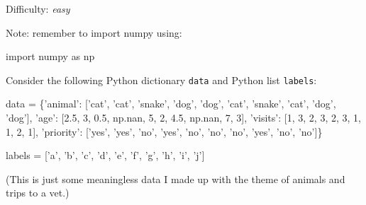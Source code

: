 \documentclass[11pt]{article}
\newenvironment{Shaded}{}{}
\newcommand{\DecValTok}[1]{\textcolor[rgb]{0.25,0.63,0.44}{{#1}}}
\newcommand{\FloatTok}[1]{\textcolor[rgb]{0.25,0.63,0.44}{{#1}}}
\newcommand{\StringTok}[1]{\textcolor[rgb]{0.25,0.44,0.63}{{#1}}}
\newcommand{\NormalTok}[1]{{#1}}
\newcommand{\ImportTok}[1]{{#1}}
\newcommand{\OperatorTok}[1]{\textcolor[rgb]{0.40,0.40,0.40}{{#1}}}
\begin{document}
Difficulty: \emph{easy}

Note: remember to import numpy using:

\begin{Shaded}
\begin{Highlighting}[]
\ImportTok{import}\NormalTok{ numpy }\ImportTok{as}\NormalTok{ np}
\end{Highlighting}
\end{Shaded}

Consider the following Python dictionary \texttt{data} and Python list
\texttt{labels}:

\begin{Shaded}
\begin{Highlighting}[]
\NormalTok{data }\OperatorTok{=}\NormalTok{ \{}\StringTok{'animal'}\NormalTok{: [}\StringTok{'cat'}\NormalTok{, }\StringTok{'cat'}\NormalTok{, }\StringTok{'snake'}\NormalTok{, }\StringTok{'dog'}\NormalTok{, }\StringTok{'dog'}\NormalTok{, }\StringTok{'cat'}\NormalTok{, }\StringTok{'snake'}\NormalTok{, }\StringTok{'cat'}\NormalTok{, }\StringTok{'dog'}\NormalTok{, }\StringTok{'dog'}\NormalTok{],}
        \StringTok{'age'}\NormalTok{: [}\FloatTok{2.5}\NormalTok{, }\DecValTok{3}\NormalTok{, }\FloatTok{0.5}\NormalTok{, np.nan, }\DecValTok{5}\NormalTok{, }\DecValTok{2}\NormalTok{, }\FloatTok{4.5}\NormalTok{, np.nan, }\DecValTok{7}\NormalTok{, }\DecValTok{3}\NormalTok{],}
        \StringTok{'visits'}\NormalTok{: [}\DecValTok{1}\NormalTok{, }\DecValTok{3}\NormalTok{, }\DecValTok{2}\NormalTok{, }\DecValTok{3}\NormalTok{, }\DecValTok{2}\NormalTok{, }\DecValTok{3}\NormalTok{, }\DecValTok{1}\NormalTok{, }\DecValTok{1}\NormalTok{, }\DecValTok{2}\NormalTok{, }\DecValTok{1}\NormalTok{],}
        \StringTok{'priority'}\NormalTok{: [}\StringTok{'yes'}\NormalTok{, }\StringTok{'yes'}\NormalTok{, }\StringTok{'no'}\NormalTok{, }\StringTok{'yes'}\NormalTok{, }\StringTok{'no'}\NormalTok{, }\StringTok{'no'}\NormalTok{, }\StringTok{'no'}\NormalTok{, }\StringTok{'yes'}\NormalTok{, }\StringTok{'no'}\NormalTok{, }\StringTok{'no'}\NormalTok{]\}}

\NormalTok{labels }\OperatorTok{=}\NormalTok{ [}\StringTok{'a'}\NormalTok{, }\StringTok{'b'}\NormalTok{, }\StringTok{'c'}\NormalTok{, }\StringTok{'d'}\NormalTok{, }\StringTok{'e'}\NormalTok{, }\StringTok{'f'}\NormalTok{, }\StringTok{'g'}\NormalTok{, }\StringTok{'h'}\NormalTok{, }\StringTok{'i'}\NormalTok{, }\StringTok{'j'}\NormalTok{]}
\end{Highlighting}
\end{Shaded}

(This is just some meaningless data I made up with the theme of animals
and trips to a vet.)
\end{document}
